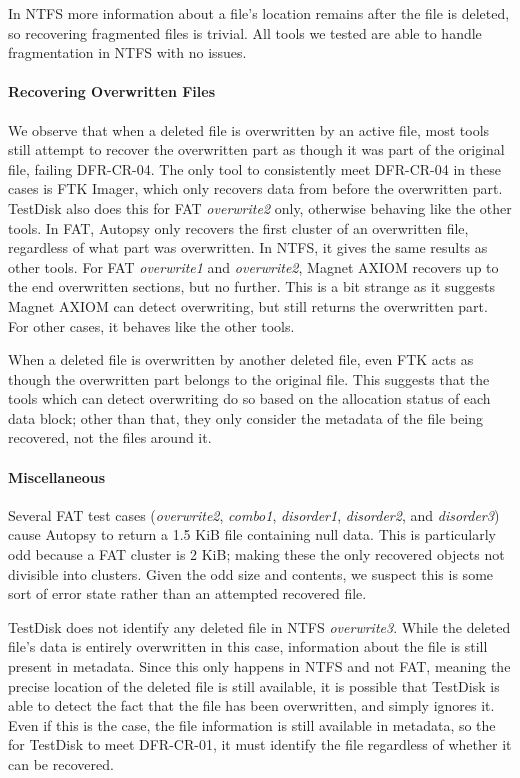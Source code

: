 In NTFS more information about a file's location remains after the file is deleted, so recovering fragmented files is trivial.
All tools we tested are able to handle fragmentation in NTFS with no issues.


\paragraph{Recovering Overwritten Files}
We observe that when a deleted file is overwritten by an active file, most tools still attempt to recover the overwritten part as though it was part of the original file, failing DFR-CR-04.
The only tool to consistently meet DFR-CR-04 in these cases is FTK Imager, which only recovers data from before the overwritten part.
TestDisk also does this for FAT \emph{overwrite2} only, otherwise behaving like the other tools.
In FAT, Autopsy only recovers the first cluster of an overwritten file, regardless of what part was overwritten.
In NTFS, it gives the same results as other tools.
For FAT \emph{overwrite1} and \emph{overwrite2}, Magnet AXIOM recovers up to the end overwritten sections, but no further.
This is a bit strange as it suggests Magnet AXIOM can detect overwriting, but still returns the overwritten part.
For other cases, it behaves like the other tools.

When a deleted file is overwritten by another deleted file, even FTK acts as though the overwritten part belongs to the original file.
This suggests that the tools which can detect overwriting do so based on the allocation status of each data block; other than that, they only consider the metadata of the file being recovered, not the files around it.

\paragraph{Miscellaneous}
Several FAT test cases (\emph{overwrite2}, \emph{combo1}, \emph{disorder1}, \emph{disorder2}, and \emph{disorder3}) cause Autopsy to return a 1.5 KiB file containing null data.
This is particularly odd because a FAT cluster is 2 KiB; making these the only recovered objects not divisible into clusters.
Given the odd size and contents, we suspect this is some sort of error state rather than an attempted recovered file.

TestDisk does not identify any deleted file in NTFS \emph{overwrite3}.
While the deleted file's data is entirely overwritten in this case, information about the file is still present in metadata.
Since this only happens in NTFS and not FAT, meaning the precise location of the deleted file is still available, it is possible that TestDisk is able to detect the fact that the file has been overwritten, and simply ignores it.
Even if this is the case, the file information is still available in metadata, so the for TestDisk to meet DFR-CR-01, it must identify the file regardless of whether it can be recovered.


